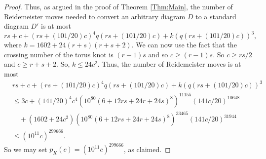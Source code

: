 \documentclass[oneside]{amsart}
\numberwithin{equation}{section}
\theoremstyle{plain}
\theoremstyle{definition}
\begin{document}
\begin{proof}
Thus, as argued in the proof of Theorem \ref{Thm:Main},
the number of Reidemeister moves needed to convert an arbitrary diagram $D$ to a standard diagram $D'$ is at most
$$rs + c + (rs + (101/20)c)^4 q(rs + (101/20)c) + k (q(rs + (101/20)c))^3,$$
where $k = 1602 + 24(r+s)(r+s+2)$. We can now use the fact that the crossing number of the torus knot is $(r-1)s$ and so $c \geq (r-1)s$. 
So $c \geq rs/2$ and $c \geq r+s+2$. So, $k \leq 24c^2$. Thus,
the number of Reidemeister moves is at most
\begin{align*}
& rs + c + (rs + (101/20)c)^4 q(rs + (101/20)c) + k (q(rs + (101/20)c))^3 \\ 
&\leq 3c + (141/20)^4 c^4 (10^{80} (6 + 12rs + 24r + 24s)^8)^{11155}  (141c/20)^{10648} \\
& \quad+  (1602 + 24c^2)(10^{80} (6 + 12rs + 24r + 24s)^8)^{33465} (141c/20)^{31944} \\
&\leq (10^{11} c)^{299666}.
\end{align*}
So we may set $p_K(c) = (10^{11}c)^{299666}$, as claimed.
\end{proof}



\end{document}
